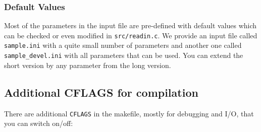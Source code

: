 \documentclass[a4paper,12pt]{scrartcl}
\begin{document}
\subsubsection{Default Values}
Most of the parameters in the input file are pre-defined with default values which can be checked or even modified in \texttt{src/readin.c}. We provide an input file called \texttt{sample.ini} with a quite small number of parameters and another one called \texttt{sample\_devel.ini} with all parameters that can be used. You can extend the short version by any parameter from the long version.

\subsection{Additional CFLAGS for compilation} \label{additionalcflags}
There are additional \texttt{CFLAGS} in the makefile, mostly for debugging and I/O, that you can switch on/off:
\end{document}
